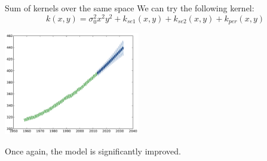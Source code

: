 \documentclass{beamer}
\begin{document}
\begin{frame}{Sum of kernels over the same space }
We can try the following kernel:
\begin{equation*}
k(x,y) = \sigma_0^2  x^2 y^2 + k_{se1}(x,y) + k_{se2}(x,y) + k_{per}(x,y)
\end{equation*}
\pause
\begin{center}
\vspace{-8mm}  \includegraphics[height=4.5cm]{figures/python/CO2-rbfabpq}
\end{center}
\begin{block}{}
\centering
\alert{Once again, the model is significantly improved.}
\end{block}
\end{frame}
\end{document}
